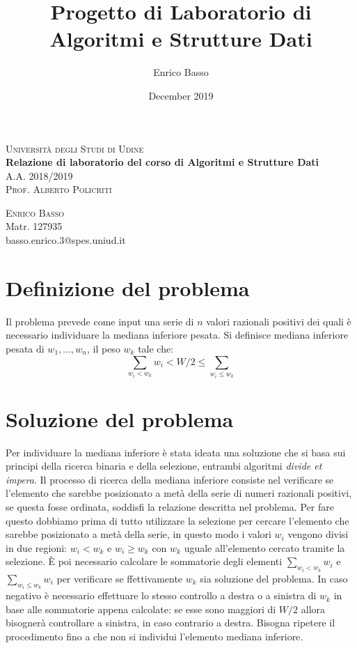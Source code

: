 \documentclass{article}
\title{Progetto di Laboratorio di Algoritmi e Strutture Dati}
\author{Enrico Basso}
\date{December 2019}
\begin{document}
\begin{titlepage}
    \begin{center}
        \textsc{\LARGE Università degli Studi di Udine} \\
        [20mm]
        \huge{\bfseries Relazione di laboratorio del corso di Algoritmi e Strutture Dati} \\
        [5mm]
        \textsc{\large A.A. 2018/2019} \\
        [1cm]
        \textsc{\Large Prof. Alberto Policriti} \\
        [9cm]
    \end{center}
    \begin{flushright}
        
        \textsc{\large Enrico Basso \\}
        Matr. 127935 \\
        basso.enrico.3@spes.uniud.it
    \end{flushright}

\end{titlepage}
\newpage
{}

\section{Definizione del problema}
Il problema prevede come input una serie di $n$ valori razionali positivi dei quali è necessario individuare la mediana inferiore pesata. Si definisce mediana inferiore pesata di $w_1, ..., w_n$, il peso $w_k$ tale che:
\begin{equation*}
    \sum_{w_i < w_k} w_i < W/2 \leq \sum_{w_i \leq w_k}
\end{equation*}

\section{Soluzione del problema}
Per individuare la mediana inferiore è stata ideata una soluzione che si basa sui principi della ricerca binaria e della selezione, entrambi algoritmi \textit{divide et impera}. Il processo di ricerca della mediana inferiore consiste nel verificare se l'elemento che sarebbe posizionato a metà della serie di numeri razionali positivi, se questa fosse ordinata, soddisfi la relazione descritta nel problema. Per fare questo dobbiamo prima di tutto utilizzare la selezione per cercare l'elemento che sarebbe posizionato a metà della serie, in questo modo i valori $w_i$ vengono divisi in due regioni: $w_i < w_k$ e $w_i \geq w_k$ con $w_k$ uguale all'elemento cercato tramite la selezione. È poi necessario calcolare le sommatorie degli elementi $\sum_{w_i < w_k} w_i$ e $\sum_{w_i \leq w_k} w_i$ per verificare se ffettivamente $w_k$ sia soluzione del problema. In caso negativo è necessario effettuare lo stesso controllo a destra o a sinistra di $w_k$ in base alle sommatorie appena calcolate: se esse sono maggiori di $W/2$ allora bisognerà controllare a sinistra, in caso contrario a destra. Bisogna ripetere il procedimento fino a che non si individui l'elemento mediana inferiore. 
\end{document}
